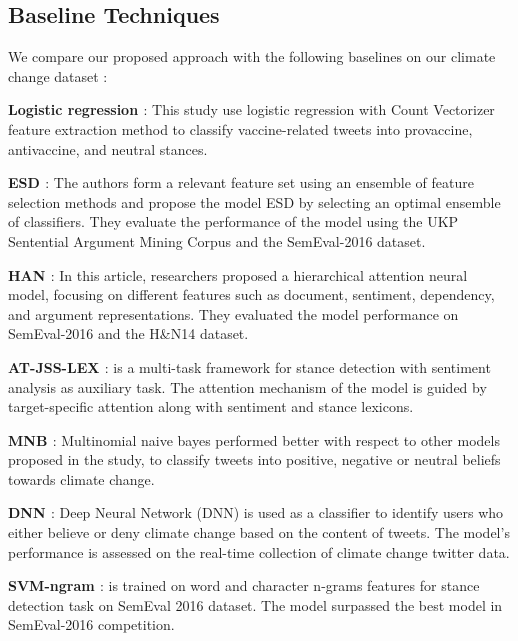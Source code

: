 \documentclass[letterpaper]{article} %
\begin{document}
\subsection{Baseline Techniques} \label{baselines_section}
We compare our proposed approach with the following baselines on our climate change dataset :
\par\noindent\textbf{Logistic regression \cite{argyris2021using}}: This study use logistic regression with Count Vectorizer feature extraction method to classify vaccine-related tweets into provaccine, antivaccine, and neutral stances.

\par\noindent\textbf{ESD \cite{vychegzhanin2021new}}: The authors form a relevant feature set using an ensemble of feature selection methods and propose the model ESD by selecting an optimal ensemble of classifiers. They evaluate the performance of the model using the UKP Sentential Argument Mining Corpus and the SemEval-2016 dataset.

\par\noindent\textbf{HAN \cite{wang2020neural}}: In this article, researchers proposed a hierarchical attention neural model, focusing on different features such as document, sentiment, dependency, and argument representations. They evaluated the model performance on SemEval-2016 and the H\&N14 dataset.

\par\noindent\textbf{AT-JSS-LEX \cite{li2019multi}}: is a multi-task framework for stance detection with sentiment analysis as auxiliary task. The attention mechanism of the model is guided by target-specific attention along with sentiment and stance lexicons. 

\par\noindent\textbf{MNB \cite{kabaghe66classifying}}: Multinomial naive bayes performed better with respect to other models proposed in the study, to classify tweets into positive, negative or neutral beliefs towards climate change.

\par\noindent\textbf{DNN \cite{chen2019detecting}}: Deep Neural Network (DNN) is used as a classifier to identify users who either believe or deny climate change based on the content of tweets. The model's performance is assessed on the real-time collection of climate change twitter data.
\par\noindent\textbf{SVM-ngram \cite{sobhani2016detecting}}: is trained on word and character n-grams features for stance detection task on SemEval 2016 dataset. The model surpassed the best model in SemEval-2016 competition.
\end{document}
